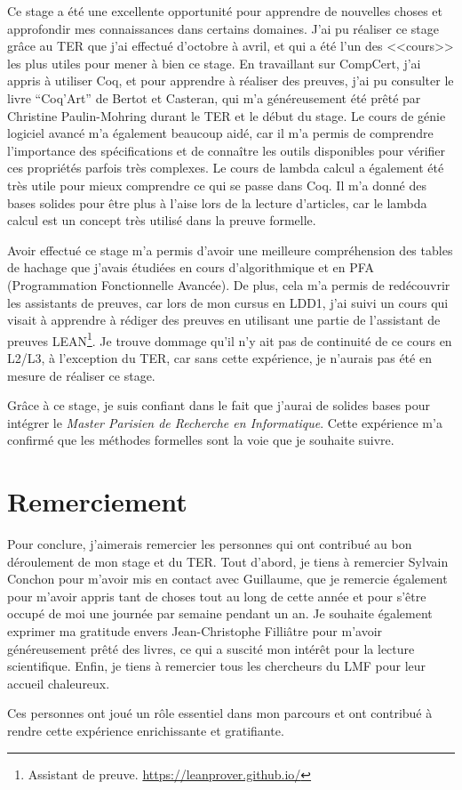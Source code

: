 \documentclass{article}
\begin{document}
  Ce stage a été une excellente opportunité pour apprendre de nouvelles choses
et approfondir mes connaissances dans certains domaines. J'ai pu réaliser ce
stage grâce au TER que j'ai effectué d'octobre à avril, et qui a été l'un des
<<cours>> les plus utiles pour mener à bien ce stage. En travaillant sur
CompCert, j'ai appris à utiliser Coq, et pour apprendre à réaliser des preuves,
j'ai pu consulter le livre ``Coq'Art'' de Bertot et Casteran\cite{bertot2015coq},
qui m'a généreusement été prêté par Christine Paulin-Mohring durant le TER et le
début du stage. Le cours de génie logiciel avancé m'a également beaucoup aidé,
car il m'a permis de comprendre l'importance des spécifications et de connaître
les outils disponibles pour vérifier ces propriétés parfois très complexes. Le
cours de lambda calcul a également été très utile pour mieux comprendre ce qui
se passe dans Coq. Il m'a donné des bases solides pour être plus à l'aise lors
de la lecture d'articles, car le lambda calcul est un concept très utilisé dans
la preuve formelle.

Avoir effectué ce stage m'a permis d'avoir une meilleure compréhension des
tables de hachage que j'avais étudiées en cours d'algorithmique et en PFA
(Programmation Fonctionnelle Avancée). De plus, cela m'a permis de redécouvrir
les assistants de preuves, car lors de mon cursus en LDD1, j'ai suivi un cours
qui visait à apprendre à rédiger des preuves en utilisant une partie de
l'assistant de preuves LEAN\footnote{Assistant de preuve.
\url{https://leanprover.github.io/}}. Je trouve dommage qu'il n'y ait pas de
continuité de ce cours en L2/L3, à l'exception du TER, car sans cette
expérience, je n'aurais pas été en mesure de réaliser ce stage.

Grâce à ce stage, je suis confiant dans le fait que j'aurai de solides bases
pour intégrer le \textit{Master Parisien de Recherche en Informatique}. Cette
expérience m'a confirmé que les méthodes formelles sont la voie que
je souhaite suivre.

  \section{Remerciement}

  Pour conclure, j'aimerais remercier les personnes qui ont contribué au bon
déroulement de mon stage et du TER. Tout d'abord, je tiens à remercier Sylvain
Conchon pour m'avoir mis en contact avec Guillaume, que je remercie également
pour m'avoir appris tant de choses tout au long de cette année et pour s'être
occupé de moi une journée par semaine pendant un an. Je souhaite également
exprimer ma gratitude envers Jean-Christophe Filliâtre pour m'avoir
généreusement prêté des livres, ce qui a suscité mon intérêt pour la lecture
scientifique. Enfin, je tiens à remercier tous les chercheurs du LMF pour leur
accueil chaleureux.

  Ces personnes ont joué un rôle essentiel dans mon parcours et ont contribué à
rendre cette expérience enrichissante et gratifiante.

  
  
\end{document}
